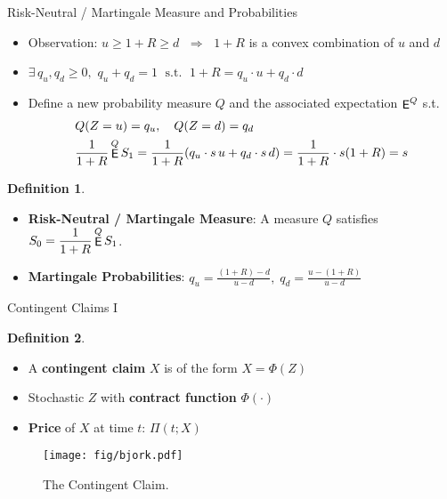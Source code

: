 \documentclass[10pt,handout]{beamer}
\newcommand{\ds}{\displaystyle}
\newcommand{\ie}{\;\Longrightarrow\;}
\newcommand{\ifff}{\;\Longleftrightarrow\;}
\DeclareMathOperator\expc{{\sf E}}
\theoremstyle{definition}
\newtheorem*{dfn}{Definition}
\newtheorem*{thm}{Theorem}
\begin{document}

\begin{frame}{Risk-Neutral / Martingale Measure and Probabilities}
  \begin{itemize}
    \item Observation: $u\geqslant 1+R \geqslant d$ $\ie$ $1 + R$ is a convex combination of $u$ and $d$  
    \item $\ds\exists\,q_u, q_d \geqslant 0,\,\,q_u+q_d = 1\;\text{ s.t. }\; 1 + R = q_u\cdot u + q_d\cdot d$
    \item Define a new probability measure $Q$ and the associated expectation $\expc^Q$ s.t. 
      \begin{align*}
        &Q(Z = u) = q_u,\quad Q(Z = d) = q_d \\
        &\frac{1}{1+R}\expc^Q S_1 = \frac{1}{1+R}(q_u\cdot s\,u + q_d\cdot s\,d) = \frac{1}{1+R}\cdot s(1+R) = s
      \end{align*}
  \end{itemize}
  \begin{dfn}
    \begin{itemize}
      \item \textbf{Risk-Neutral / Martingale Measure}: A measure $Q$ satisfies $\ds S_0 = \frac{1}{1+R}\expc^Q S_1$.
      \item \textbf{Martingale Probabilities}: $\ds q_u = \frac{(1+R)-d}{u-d}, \;q_d = \frac{u-(1+R)}{u-d}$
    \end{itemize}
  \end{dfn}
\end{frame}

\begin{frame}{Contingent Claims I}
  \begin{dfn}
    \begin{itemize}
      \item A \textbf{contingent claim} $X$ is of the form $X=\Phi(Z)$
      \item Stochastic $Z$ with \textbf{contract function} $\Phi(\cdot)$
      \item \textbf{Price} of $X$ at time $t$: $\Pi(t; X)$
    \end{itemize}
  \end{dfn}
  \begin{figure}[!htbp]
    \centering
    \texttt{[image: fig/bjork.pdf]}
    \caption{The Contingent Claim.}
    \label{fig:bn2}
  \end{figure}
\end{frame}
\end{document}
